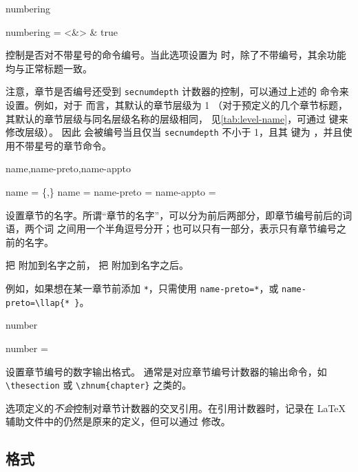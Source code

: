 \documentclass[twoside]{book}
\begin{document}
\begin{keyval}[path=title/...]{numbering}
  \begin{syntax}
    numbering = <&\TTF> & true 
  \end{syntax}
控制是否对不带星号的命令编号。当此选项设置为  时，除了不带编号，其余功能均与正常标题一致。

注意，章节是否编号还受到 \texttt{secnumdepth} 计数器的控制，可以通过上述的 
 命令来设置。例如，对于  而言，其默认的章节层级为 1
（对于预定义的几个章节标题，其默认的章节层级与同名层级名称的层级相同，
见\cref{tab:level-name}，可通过  键来修改层级）。
因此  会被编号当且仅当 \texttt{secnumdepth}
不小于 1，且其  键为 ，并且使用不带星号的章节命令。
\end{keyval}

\begin{keyval}[path=title/...]{name,name-preto,name-appto}
  \begin{syntax}
    name = \{,\}
    name = 
    name-preto = 
    name-appto = 
  \end{syntax}
设置章节的名字。所谓“章节的名字”，可以分为前后两部分，即章节编号前后的词语，两个词
之间用一个半角逗号分开；也可以只有一部分，表示只有章节编号之前的名字。

 把  附加到名字之前， 把  附加到名字之后。

例如，如果想在某一章节前添加 \verb|*|，只需使用 \verb|name-preto=*|，或 \verb|name-preto=|\allowbreak\verb|\llap{* }|。
\end{keyval}

\begin{keyval}[path=title/...]{number}
  \begin{syntax}
    number = 
  \end{syntax}
设置章节编号的数字输出格式。 通常是对应章节编号计数器的输出命令，如
\verb|\thesection| 或 \verb|\zhnum{chapter}| 之类的。

选项定义的\emph{不会}控制对章节计数器的交叉引用。在引用计数器时，记录在
\LaTeX 辅助文件中的仍然是原来的定义，但可以通过  修改。
\end{keyval}


\subsection{格式}
\end{document}
